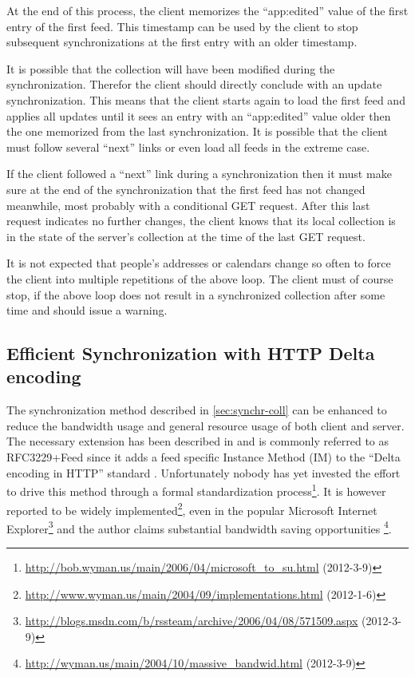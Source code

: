 \documentclass[11pt,a4paper,headsepline,twoside]{scrartcl}		%
\newcommand{\citeurl}[2]{\url{#1} (#2)}
\begin{document}
At the end of this process, the client memorizes the ``app:edited'' value of the
first entry of the first feed. This timestamp can be used by the client to stop
subsequent synchronizations at the first entry with an older timestamp.

It is possible that the collection will have been modified during the
synchronization. Therefor the client should directly conclude with an update
synchronization. This means that the client starts again to load the first feed
and applies all updates until it sees an entry with an ``app:edited'' value
older then the one memorized from the last synchronization. It is possible that
the client must follow several ``next'' links or even load all feeds in the
extreme case.

If the client followed a ``next'' link during a synchronization then it must
make sure at the end of the synchronization that the first feed has not changed
meanwhile, most probably with a conditional GET request. After this last request
indicates no further changes, the client knows that its local collection is in
the state of the server's collection at the time of the last GET request. 

It is not expected that people's addresses or calendars change so often to force
the client into multiple repetitions of the above loop. The client must of
course stop, if the above loop does not result in a synchronized collection
after some time and should issue a warning.

\subsection{Efficient Synchronization with HTTP Delta encoding}
\label{sec:effic-synchr-with}

The synchronization method described in \autoref{sec:synchr-coll} can be
enhanced to reduce the bandwidth usage and general resource usage of both client
and server. The necessary extension has been described in \cite{Wyman2004} and
is commonly referred to as RFC3229+Feed since it adds a feed specific Instance
Method (IM) to the ``Delta encoding in HTTP''
standard \cite{RFC3229}. Unfortunately nobody has yet invested the effort to
drive this method through a formal standardization
process\footnote{\citeurl{http://bob.wyman.us/main/2006/04/microsoft_to_su.html}{2012-3-9}}. It
is however reported to be widely
implemented\footnote{\citeurl{http://www.wyman.us/main/2004/09/implementations.html}{2012-1-6}},
even in the popular Microsoft Internet
Explorer\footnote{\citeurl{http://blogs.msdn.com/b/rssteam/archive/2006/04/08/571509.aspx}{2012-3-9}}
and the author claims substantial bandwidth saving opportunities
\footnote{\citeurl{http://wyman.us/main/2004/10/massive_bandwid.html}{2012-3-9}}.
\end{document}
